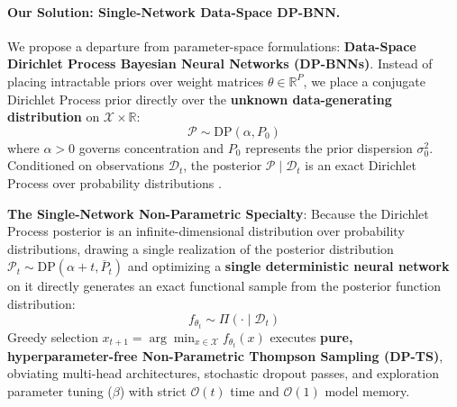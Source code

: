 \documentclass{article}
\begin{document}
\paragraph{Our Solution: Single-Network Data-Space DP-BNN.}
We propose a departure from parameter-space formulations: \textbf{Data-Space Dirichlet Process Bayesian Neural Networks (DP-BNNs)}. Instead of placing intractable priors over weight matrices $\theta \in \mathbb{R}^P$, we place a conjugate Dirichlet Process prior directly over the \textbf{unknown data-generating distribution} on $\mathcal{X} \times \mathbb{R}$:
\begin{equation}
\label{eq:dp_prior_intro}
\mathcal{P} \sim \mathrm{DP}(\alpha, P_0)
\end{equation}
where $\alpha > 0$ governs concentration and $P_0$ represents the prior dispersion $\sigma_0^2$. Conditioned on observations $\mathcal{D}_t$, the posterior $\mathcal{P} \mid \mathcal{D}_t$ is an exact Dirichlet Process over probability distributions \citep{ferguson1973bayesian,vashishtha2025leveraging,vashishtha2025tmlr,vashishtha2026thesis}.

\textbf{The Single-Network Non-Parametric Specialty}: Because the Dirichlet Process posterior is an infinite-dimensional distribution over probability distributions, drawing a single realization of the posterior distribution $\mathcal{P}_t \sim \mathrm{DP}(\alpha + t, \overline{P}_t)$ and optimizing a \textbf{single deterministic neural network} on it directly generates an exact functional sample from the posterior function distribution:
\begin{equation}
f_{\theta_t} \sim \Pi(\cdot \mid \mathcal{D}_t)
\end{equation}
Greedy selection $x_{t+1} = \arg\min_{x \in \mathcal{X}} f_{\theta_t}(x)$ executes \textbf{pure, hyperparameter-free Non-Parametric Thompson Sampling (DP-TS)}, obviating multi-head architectures, stochastic dropout passes, and exploration parameter tuning ($\beta$) with strict $\mathcal{O}(t)$ time and $\mathcal{O}(1)$ model memory.
\end{document}
